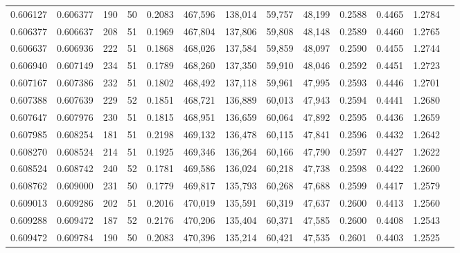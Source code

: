 \begin{tabular}{rrrrrrrrrrrrr}
0.606127 & 0.606377 &   190 &  50 &                                     0.2083 & 467,596 & 138,014 &  59,757 &  48,199 & 0.2588 & 0.4465 & 1.2784 \\
0.606377 & 0.606637 &   208 &  51 &                                     0.1969 & 467,804 & 137,806 &  59,808 &  48,148 & 0.2589 & 0.4460 & 1.2765 \\
0.606637 & 0.606936 &   222 &  51 &                                     0.1868 & 468,026 & 137,584 &  59,859 &  48,097 & 0.2590 & 0.4455 & 1.2744 \\
0.606940 & 0.607149 &   234 &  51 &                                     0.1789 & 468,260 & 137,350 &  59,910 &  48,046 & 0.2592 & 0.4451 & 1.2723 \\
0.607167 & 0.607386 &   232 &  51 &                                     0.1802 & 468,492 & 137,118 &  59,961 &  47,995 & 0.2593 & 0.4446 & 1.2701 \\
0.607388 & 0.607639 &   229 &  52 &                                     0.1851 & 468,721 & 136,889 &  60,013 &  47,943 & 0.2594 & 0.4441 & 1.2680 \\
0.607647 & 0.607976 &   230 &  51 &                                     0.1815 & 468,951 & 136,659 &  60,064 &  47,892 & 0.2595 & 0.4436 & 1.2659 \\
0.607985 & 0.608254 &   181 &  51 &                                     0.2198 & 469,132 & 136,478 &  60,115 &  47,841 & 0.2596 & 0.4432 & 1.2642 \\
0.608270 & 0.608524 &   214 &  51 &                                     0.1925 & 469,346 & 136,264 &  60,166 &  47,790 & 0.2597 & 0.4427 & 1.2622 \\
0.608524 & 0.608742 &   240 &  52 &                                     0.1781 & 469,586 & 136,024 &  60,218 &  47,738 & 0.2598 & 0.4422 & 1.2600 \\
0.608762 & 0.609000 &   231 &  50 &                                     0.1779 & 469,817 & 135,793 &  60,268 &  47,688 & 0.2599 & 0.4417 & 1.2579 \\
0.609013 & 0.609286 &   202 &  51 &                                     0.2016 & 470,019 & 135,591 &  60,319 &  47,637 & 0.2600 & 0.4413 & 1.2560 \\
0.609288 & 0.609472 &   187 &  52 &                                     0.2176 & 470,206 & 135,404 &  60,371 &  47,585 & 0.2600 & 0.4408 & 1.2543 \\
0.609472 & 0.609784 &   190 &  50 &                                     0.2083 & 470,396 & 135,214 &  60,421 &  47,535 & 0.2601 & 0.4403 & 1.2525 \\

\end{tabular}
